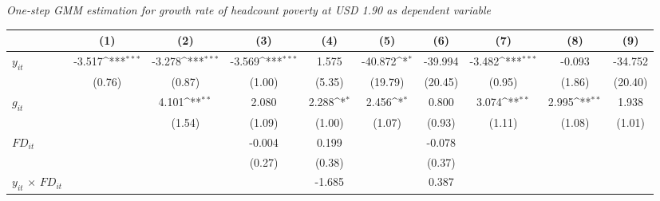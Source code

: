 \documentclass[12pt, a4paper]{article}
\begin{document}
\begin{appendices}
\begin{table}[htbp]
\begin{threeparttable}
\begin{tablenotes}
		\end{tablenotes}
	\end{threeparttable}
	\caption[One-Step System-GMM Estimation Results for Headcount Poverty at USD 1.90]{\textit{One-step GMM estimation for growth rate of headcount poverty at USD 1.90 as dependent variable}}
	\label{1GMM190full}
\end{table}

	\begin{table}[htbp]
	\centering
	\scriptsize
	\setlength\tabcolsep{1pt}	
	\begin{threeparttable}
		{
			\def\sym#1{\ifmmode^{#1}\else\(^{#1}\)\fi}
			\begin{tabular}{l*{9}{c}}
				\hline\hline
				&\multicolumn{1}{c}{(1)}&\multicolumn{1}{c}{(2)}&\multicolumn{1}{c}{(3)}&\multicolumn{1}{c}{(4)}&\multicolumn{1}{c}{(5)}&\multicolumn{1}{c}{(6)}&\multicolumn{1}{c}{(7)}&\multicolumn{1}{c}{(8)}&\multicolumn{1}{c}{(9)}\\
				\hline
				$y_{it}$               &      -3.517\sym{***}&      -3.278\sym{***}&      -3.569\sym{***}&       1.575         &     -40.872\sym{*}  &     -39.994         &      -3.482\sym{***}&      -0.093         &     -34.752         \\
				&      (0.76)         &      (0.87)         &      (1.00)         &      (5.35)         &     (19.79)         &     (20.45)         &      (0.95)         &      (1.86)         &     (20.40)         \\
				$g_{it}$             &                     &       4.101\sym{**} &       2.080         &       2.288\sym{*}  &       2.456\sym{*}  &       0.800         &       3.074\sym{**} &       2.995\sym{**} &       1.938         \\
				&                     &      (1.54)         &      (1.09)         &      (1.00)         &      (1.07)         &      (0.93)         &      (1.11)         &      (1.08)         &      (1.01)         \\
				$FD_{it}$                &                     &                     &      -0.004         &       0.199         &                     &      -0.078         &                     &                     &                     \\
				&                     &                     &      (0.27)         &      (0.38)         &                     &      (0.37)         &                     &                     &                     \\
				$y_{it}$ $\times$ $FD_{it}$ &                     &                     &                     &      -1.685         &                     &       0.387         &                     &                     &                     \\

\end{tabular}}
\end{threeparttable}
\end{table}
\end{appendices}
\end{document}
